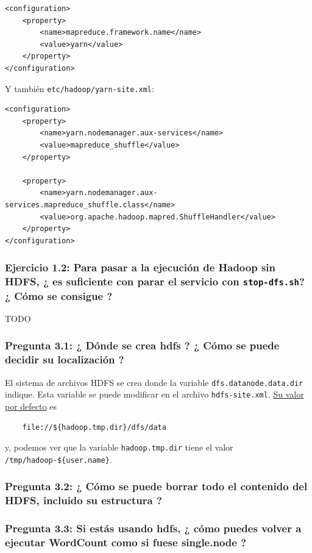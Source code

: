 \documentclass[11pt]{article}
\def\inline{\lstinline[basicstyle=\ttfamily,keywordstyle={}]}
\begin{document}
\begin{verbatim}
<configuration>
    <property>
        <name>mapreduce.framework.name</name>
        <value>yarn</value>
    </property>
</configuration>
\end{verbatim}
Y también  \inline{etc/hadoop/yarn-site.xml}:

\begin{verbatim}
<configuration>
    <property>
        <name>yarn.nodemanager.aux-services</name>
        <value>mapreduce_shuffle</value>
    </property>
    
    <property>
        <name>yarn.nodemanager.aux-services.mapreduce_shuffle.class</name>
        <value>org.apache.hadoop.mapred.ShuffleHandler</value>
    </property>
</configuration>
\end{verbatim}


\subsubsection*{ Ejercicio 1.2: Para pasar a la ejecución de Hadoop sin HDFS, ¿ es suficiente con parar el servicio con  \inline{stop-dfs.sh}? ¿ Cómo se consigue ? }

TODO





\subsubsection*{ Pregunta 3.1: ¿ Dónde se crea hdfs ? ¿ Cómo se puede decidir su localización ? }

El sistema de archivos HDFS se crea donde la variable \inline{dfs.datanode.data.dir }indique. Esta variable se puede modificar en el archivo  \inline{hdfs-site.xml}. \href{https://hadoop.apache.org/docs/r2.4.1/hadoop-project-dist/hadoop-hdfs/hdfs-default.xml}{Su valor por defecto} es
\begin{verbatim}
	file://${hadoop.tmp.dir}/dfs/data
\end{verbatim}
y, podemos ver que la variable  \inline{hadoop.tmp.dir} tiene el valor \inline|/tmp/hadoop-${user.name}|.


\subsubsection*{ Pregunta 3.2: ¿ Cómo se puede borrar todo el contenido del HDFS, incluido su estructura ?}


\subsubsection*{ Pregunta 3.3: Si estás usando hdfs, ¿ cómo puedes volver a ejecutar WordCount como si fuese single.node ? }
\end{document}
